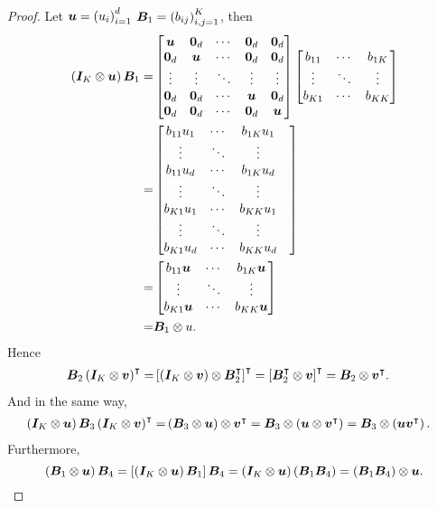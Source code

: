 \begin{proof}
Let ${\bm{u}}=\left({u_i}\right)_{i=1}^d$ ${\bm{B}}_1=\left({b_{ij}}\right)_{i,j=1}^K$, then
\begin{equation*}
    \begin{aligned}
        \left({{\bm{I}}_K\otimes{\bm{u}}}\right){\bm{B}}_1=&\begin{bmatrix}
{\bm{u}} & \bm{0}_d & \cdots & \bm{0}_d & \bm{0}_d \\
\bm{0}_d & {\bm{u}} & \cdots & \bm{0}_d & \bm{0}_d \\
\vdots & \vdots & \ddots & \vdots & \vdots \\
\bm{0}_d & \bm{0}_d & \cdots & {\bm{u}} & \bm{0}_d \\
\bm{0}_d & \bm{0}_d & \cdots & \bm{0}_d & {\bm{u}}
\end{bmatrix}\begin{bmatrix}
b_{11} & \cdots & b_{1K} \\
\vdots & \ddots & \vdots \\
b_{K1} & \cdots & b_{KK} 
\end{bmatrix}\\
=&\begin{bmatrix}
b_{11}u_1  & \cdots & b_{1K}u_1  \\
\vdots &\ddots & \vdots &\\
b_{11}u_d  & \cdots &  b_{1K}u_d\\
\vdots &\ddots & \vdots &\\
b_{K1}u_1  & \cdots &b_{KK} u_1  \\
\vdots &\ddots & \vdots &\\
b_{K1}u_d  & \cdots & b_{KK}u_d 
\end{bmatrix}\\
=&\begin{bmatrix}
b_{11}{\bm{u}} & \cdots & b_{1K}{\bm{u}} \\
\vdots & \ddots & \vdots \\
b_{K1}{\bm{u}} & \cdots & b_{KK}{\bm{u}} 
\end{bmatrix}\\
=& {\bm{B}}_1\otimes u.
\end{aligned}
\end{equation*}
Hence
\begin{equation*}
    \begin{aligned}
{\bm{B}}_2\left({{\bm{I}}_K\otimes{\bm{v}}}\right)^{\intercal}=&\left[{\left({{\bm{I}}_K\otimes{\bm{v}}}\right)\otimes {\bm{B}}^{\intercal}_2}\right]^{\intercal}=\left[{{\bm{B}}^{\intercal}_2\otimes {\bm{v}}}\right]^{\intercal}={\bm{B}}_2\otimes{\bm{v}}^{\intercal}.
\end{aligned}
\end{equation*}
And in the same way,
\begin{equation*}
    \begin{aligned}
\left({{\bm{I}}_K\otimes{\bm{u}}}\right){\bm{B}}_3\left({{\bm{I}}_K\otimes{\bm{v}}}\right)^{\intercal}=&\left({{\bm{B}}_3\otimes {\bm{u}}}\right)\otimes {\bm{v}}^{\intercal}={\bm{B}}_3\otimes \left({ {\bm{u}}\otimes {\bm{v}}^{\intercal}}\right)={\bm{B}}_3\otimes\left({ {\bm{u}} {\bm{v}}^{\intercal}}\right).
\end{aligned}
\end{equation*}
Furthermore,
\begin{equation*}
    \left({{\bm{B}}_1\otimes{\bm{u}}}\right){\bm{B}}_4=\left[{\left({{\bm{I}}_K\otimes{\bm{u}}}\right){\bm{B}}_1}\right]{\bm{B}}_4=\left({{\bm{I}}_K\otimes{\bm{u}}}\right)\left({{\bm{B}}_1{\bm{B}}_4}\right)=\left({{\bm{B}}_1{\bm{B}}_4}\right)\otimes {\bm{u}}.
\end{equation*}
\end{proof}